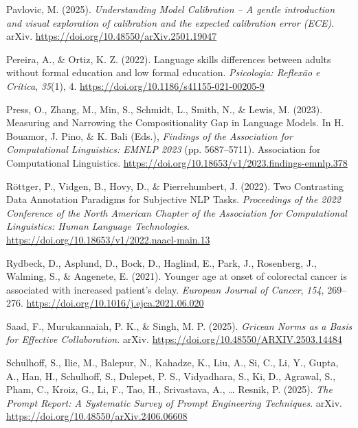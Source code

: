 \documentclass[
  12pt,
]{article}
\newlength{\cslhangindent}
\newenvironment{CSLReferences}[2] %
 {\begin{list}{}{%
  \setlength{\itemindent}{0pt}
  \setlength{\leftmargin}{0pt}
  \setlength{\parsep}{0pt}
  \ifodd #1
   \setlength{\leftmargin}{\cslhangindent}
   \setlength{\itemindent}{-1\cslhangindent}
  \fi
  \setlength{\itemsep}{#2\baselineskip}}}
 {\end{list}}
\begin{document}
\begin{CSLReferences}{1}{0}
Pavlovic, M. (2025). \emph{Understanding {Model} {Calibration} -- {A} gentle introduction and visual exploration of calibration and the expected calibration error ({ECE})}. arXiv. \url{https://doi.org/10.48550/arXiv.2501.19047}

Pereira, A., \& Ortiz, K. Z. (2022). Language skills differences between adults without formal education and low formal education. \emph{Psicologia: Reflexão e Crítica}, \emph{35}(1), 4. \url{https://doi.org/10.1186/s41155-021-00205-9}

Press, O., Zhang, M., Min, S., Schmidt, L., Smith, N., \& Lewis, M. (2023). Measuring and {Narrowing} the {Compositionality} {Gap} in {Language} {Models}. In H. Bouamor, J. Pino, \& K. Bali (Eds.), \emph{Findings of the {Association} for {Computational} {Linguistics}: {EMNLP} 2023} (pp. 5687--5711). Association for Computational Linguistics. \url{https://doi.org/10.18653/v1/2023.findings-emnlp.378}

Röttger, P., Vidgen, B., Hovy, D., \& Pierrehumbert, J. (2022). Two {Contrasting} {Data} {Annotation} {Paradigms} for {Subjective} {NLP} {Tasks}. \emph{Proceedings of the 2022 {Conference} of the {North} {American} {Chapter} of the {Association} for {Computational} {Linguistics}: {Human} {Language} {Technologies}}. \url{https://doi.org/10.18653/v1/2022.naacl-main.13}

Rydbeck, D., Asplund, D., Bock, D., Haglind, E., Park, J., Rosenberg, J., Walming, S., \& Angenete, E. (2021). Younger age at onset of colorectal cancer is associated with increased patient's delay. \emph{European Journal of Cancer}, \emph{154}, 269--276. \url{https://doi.org/10.1016/j.ejca.2021.06.020}

Saad, F., Murukannaiah, P. K., \& Singh, M. P. (2025). \emph{Gricean {Norms} as a {Basis} for {Effective} {Collaboration}}. arXiv. \url{https://doi.org/10.48550/ARXIV.2503.14484}

Schulhoff, S., Ilie, M., Balepur, N., Kahadze, K., Liu, A., Si, C., Li, Y., Gupta, A., Han, H., Schulhoff, S., Dulepet, P. S., Vidyadhara, S., Ki, D., Agrawal, S., Pham, C., Kroiz, G., Li, F., Tao, H., Srivastava, A., \ldots{} Resnik, P. (2025). \emph{The {Prompt} {Report}: {A} {Systematic} {Survey} of {Prompt} {Engineering} {Techniques}}. arXiv. \url{https://doi.org/10.48550/arXiv.2406.06608}


\end{CSLReferences}
\end{document}
